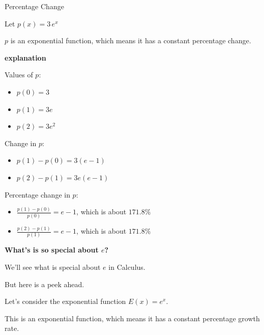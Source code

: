 \documentclass{ximera}
\begin{document}
\begin{example} Percentage Change



Let $p(x) = 3 \, e^x$ 

$p$ is an exponential function, which means it has a constant percentage change. 



\textbf{\textcolor{red!75!green}{explanation}} 

Values of $p$:

\begin{itemize}
\item $p(0) = 3$

\item $p(1) = 3 e$

\item $p(2) = 3 e^2$
\end{itemize}



Change in $p$:

\begin{itemize}
\item $p(1) - p(0) = 3 (e-1)$

\item $p(2) - p(1) = 3 e (e-1)$

\end{itemize}





Percentage change in $p$:

\begin{itemize}
\item $\frac{p(1) - p(0)}{p(0)} = e - 1$, which is about $171.8\%$

\item $\frac{p(2) - p(1)}{p(1)} = e-1 $, which is about $171.8\%$

\end{itemize}


\end{example}







\textbf{What's is so special about $e$?}

We'll see what is special about $e$ in Calculus.  

But here is a peek ahead.


Let's consider the exponential function $E(x) = e^x$.

This is an exponential function, which means it has a constant percentage growth rate.
\end{document}
